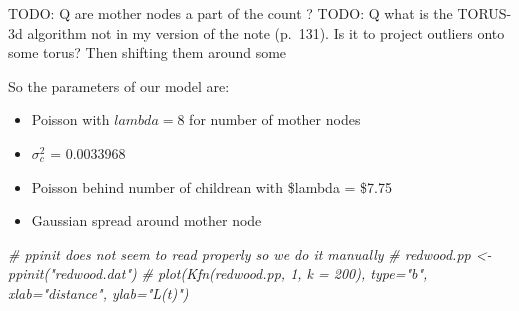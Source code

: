 \documentclass[
]{article}
\newenvironment{Shaded}{\begin{snugshade}}{\end{snugshade}}
\newcommand{\CommentTok}[1]{\textcolor[rgb]{0.56,0.35,0.01}{\textit{#1}}}
\newcommand{\DataTypeTok}[1]{\textcolor[rgb]{0.13,0.29,0.53}{#1}}
\newcommand{\KeywordTok}[1]{\textcolor[rgb]{0.13,0.29,0.53}{\textbf{#1}}}
\newcommand{\NormalTok}[1]{#1}
\newcommand{\OperatorTok}[1]{\textcolor[rgb]{0.81,0.36,0.00}{\textbf{#1}}}
\newcommand{\StringTok}[1]{\textcolor[rgb]{0.31,0.60,0.02}{#1}}
\begin{document}
\begin{Shaded}
\end{Shaded}

TODO: Q are mother nodes a part of the count ? TODO: Q what is the
TORUS-3d algorithm not in my version of the note (p.~131). Is it to
project outliers onto some torus? Then shifting them around some

So the parameters of our model are:

\begin{itemize}
\item
  Poisson with \(lambda = 8\) for number of mother nodes
\item
  \(\sigma^2_c\) = 0.0033968
\item
  Poisson behind number of childrean with \$lambda = \$7.75
\item
  Gaussian spread around mother node
\end{itemize}

\begin{Shaded}
\begin{Highlighting}[]
\CommentTok{# ppinit does not seem to read properly so we do it manually}
\CommentTok{# redwood.pp <- ppinit("redwood.dat")}
\CommentTok{# plot(Kfn(redwood.pp, 1, k = 200), type="b", xlab="distance", ylab="L(t)")}
\end{Highlighting}
\end{Shaded}
\end{document}
